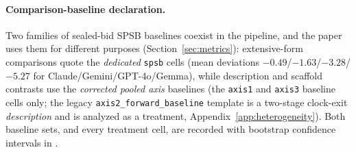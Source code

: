 \paragraph{Comparison-baseline declaration.} Two families of sealed-bid SPSB baselines coexist in the pipeline, and the paper uses them for different purposes (Section~\ref{sec:metrics}): extensive-form comparisons quote the \emph{dedicated} \texttt{spsb} cells (mean deviations $-0.49$/$-1.63$/$-3.28$/$-5.27$ for Claude/Gemini/GPT-4o/Gemma), while description and scaffold contrasts use the \emph{corrected pooled axis} baselines (the \texttt{axis1} and \texttt{axis3} baseline cells only; the legacy \texttt{axis2\_forward\_baseline} template is a two-stage clock-exit \emph{description} and is analyzed as a treatment, Appendix~\ref{app:heterogeneity}). Both baseline sets, and every treatment cell, are recorded with bootstrap confidence intervals in .

